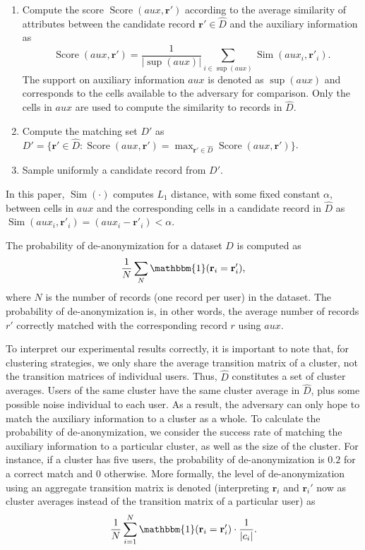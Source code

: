 \documentclass{article}
\begin{document}
\begin{enumerate}%
    \item Compute the score $\operatorname{Score}(aux, \mathbf{r}')$ according to the average similarity of  attributes between the candidate record $\mathbf{r}' \in \hat{D}$ and the auxiliary information as $$\operatorname{Score}(aux, \mathbf{r}')=\frac{1}{|\sup(aux)|}\sum_{i\in \sup(aux)} \operatorname{Sim}(aux_i, \mathbf{r}'_i).$$
    The support on auxiliary information $aux$ is denoted as $\sup(aux)$ and corresponds to the cells available to the adversary for comparison. Only the cells in $aux$ are used to compute the similarity to records in $\hat{D}$.  
    \item Compute the matching set $D'$ as $D' = \{\mathbf{r}' \in \hat{D} : \operatorname{Score}(aux, \mathbf{r}') = \max_{\mathbf{r}' \in \hat{D}} {\operatorname{Score}(aux, \mathbf{r}')}\}$.
    \item Sample uniformly a candidate record from $D'$.
\end{enumerate}
In this paper, $\operatorname{Sim}(\cdot)$ computes $L_1$ distance, with some fixed constant $\alpha$, between cells in $aux$ and the corresponding cells in a candidate record in $\hat{D}$ as $\operatorname{Sim}(aux_i, \mathbf{r}'_i) = (aux_i-\mathbf{r}'_i) < \alpha$. 

The probability of de-anonymization for a dataset $D$ is computed as $$\frac{1}{N} \sum_N \mathbbm{1}(\mathbf{r}_i = \mathbf{r}'_i),$$
where $N$ is the number of records (one record per user) in the dataset. The probability of de-anonymization is, in other words, the average number of records $r'$ correctly matched with the corresponding record $r$ using $aux$.

To interpret our experimental results correctly, it is important to note that, for clustering strategies, we only share the average transition matrix of a cluster, not the transition matrices of individual users. Thus, $\hat{D}$ constitutes a set of cluster averages. Users of the same cluster have the same cluster average in $\hat{D}$, plus some possible noise individual to each user. As a result, the adversary can only hope to match the auxiliary information to a cluster as a whole. To calculate the probability of de-anonymization, we consider the success rate of matching the auxiliary information to a particular cluster, as well as the size of the cluster. For instance, if a cluster has five users, the probability of de-anonymization is $0.2$ for a correct match and $0$ otherwise. More formally, the level of de-anonymization using an aggregate transition matrix is denoted (interpreting $\mathbf{r} _i$ and $\mathbf{r} _i'$ now as cluster averages instead of the transition matrix of a particular user) as $$\frac{1}{N} \sum_{i=1}^N \mathbbm{1}(\mathbf{r}_i = \mathbf{r}_i')\cdot \frac{1}{|c_i|}.$$ 
\end{document}
